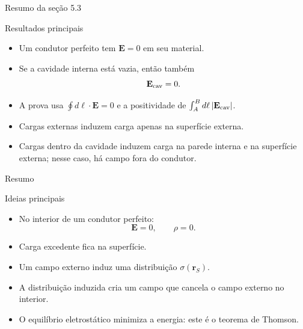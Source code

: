 \documentclass[aspectratio=169]{beamer}
\begin{document}
\begin{frame}{Resumo da seção 5.3}

\begin{mybox}{Resultados principais}
\begin{itemize}
\item Um condutor perfeito tem \(\mathbf E=0\) em seu material.
\item Se a cavidade interna está vazia, então também
\[
\mathbf E_{\rm cav}=0.
\]
\item A prova usa \(\oint d\boldsymbol{\ell}\cdot\mathbf E=0\) e a positividade
de \(\int_A^B d\ell\,|\mathbf E_{\rm cav}|\).
\item Cargas externas induzem carga apenas na superfície externa.
\item Cargas dentro da cavidade induzem carga na parede interna e na superfície
externa; nesse caso, há campo fora do condutor.
\end{itemize}
\end{mybox}

\end{frame}

\begin{frame}{Resumo}

\begin{mybox}{Ideias principais}
\begin{itemize}
\item No interior de um condutor perfeito:
\[
\mathbf E=0,
\qquad
\rho=0.
\]

\item Carga excedente fica na superfície.

\item Um campo externo induz uma distribuição \(\sigma(\mathbf r_S)\).

\item A distribuição induzida cria um campo que cancela o campo externo no interior.

\item O equilíbrio eletrostático minimiza a energia: este é o teorema de Thomson.
\end{itemize}
\end{mybox}

\end{frame}
\end{document}

